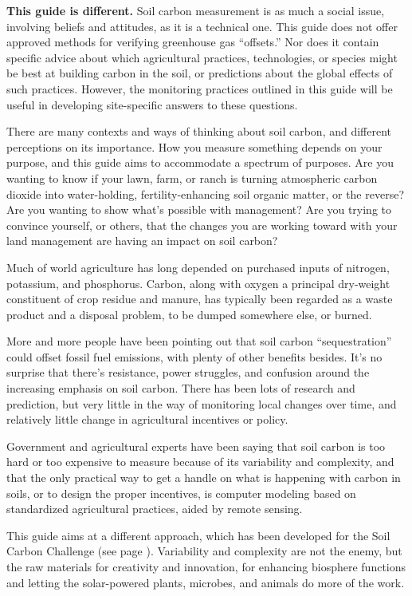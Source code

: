 \documentclass[11pt,letterpaper,oneside,onecolumn]{memoir}
\begin{document}
\textbf{This guide is different.} Soil carbon measurement is as much a social issue, involving beliefs and attitudes, as it is a technical one. This guide does not offer approved methods for verifying greenhouse gas ``offsets.'' Nor does it contain specific advice about which agricultural practices, technologies, or species might be best at building carbon in the soil, or predictions about the global effects of such practices. However, the monitoring practices outlined in this guide will be useful in developing site-specific answers to these questions.

There are many contexts and ways of thinking about soil carbon, and different perceptions on its importance. How you measure something depends on your purpose, and this guide aims to accommodate a spectrum of purposes. Are you wanting to know if your lawn, farm, or ranch is turning atmospheric carbon dioxide into water-holding, fertility-enhancing soil organic matter, or the reverse? Are you wanting to show what's possible with management? Are you trying to convince yourself, or others, that the changes you are working toward with your land management are having an impact on soil carbon?

Much of world agriculture has long depended on purchased inputs of nitrogen, potassium, and phosphorus. Carbon, along with oxygen a principal dry-weight constituent of crop residue and manure, has typically been regarded as a waste product and a disposal problem, to be dumped somewhere else, or burned.

More and more people have been pointing out that soil carbon ``sequestration'' could offset fossil fuel emissions, with plenty of other benefits besides. It's no surprise that there's resistance, power struggles, and confusion around the increasing emphasis on soil carbon. There has been lots of research and prediction, but very little in the way of monitoring local changes over time, and relatively little change in agricultural incentives or policy.

Government and agricultural experts have been saying that soil carbon is too hard or too expensive to measure because of its variability and complexity, and that the only practical way to get a handle on what is happening with carbon in soils, or to design the proper incentives, is computer modeling based on standardized agricultural practices, aided by remote sensing.

This guide aims at a different approach, which has been developed for the Soil Carbon Challenge (see page \pageref{challenge}). Variability and complexity are not the enemy, but the raw materials for creativity and innovation, for enhancing biosphere functions and letting the solar-powered plants, microbes, and animals do more of the work.
\end{document}
